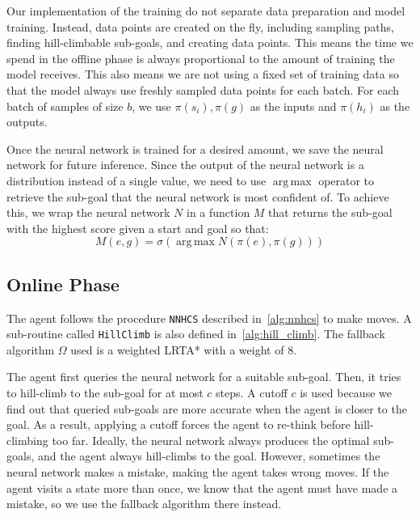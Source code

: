 \documentclass[letterpaper]{article}
\numberwithin{equation}{section}
\numberwithin{theorem}{section}
\numberwithin{lemma}{section}
\numberwithin{df}{section}
\DeclareMathOperator*{\argmax}{arg\,max}
\begin{document}
    Our implementation of the training do not separate data preparation and model training.
    Instead, data points are created on the fly, including sampling paths, finding hill-climbable sub-goals, and creating data points.
    This means the time we spend in the offline phase is always proportional to the amount of training the model receives.
    This also means we are not using a fixed set of training data so that the model always use freshly sampled data points for each batch.
    For each batch of samples of size $b$, we use $\pi(s_i), \pi(g)$ as the inputs and $\pi(h_i)$ as the outputs.

    Once the neural network is trained for a desired amount, we save the neural network for future inference.
    Since the output of the neural network is a distribution instead of a single value, we need to use $\argmax$ operator to retrieve the sub-goal that the neural network is most confident of.
    To achieve this, we wrap the neural network $N$ in a function $M$ that returns the sub-goal with the highest score given a start and goal so that:
    \[ M(e, g) = \sigma(\argmax N(\pi(e), \pi(g))) \]

    \subsection{Online Phase}

    The agent follows the procedure \texttt{NNHCS} described in~\ref{alg:nnhcs} to make moves.
    A sub-routine called \texttt{HillClimb} is also defined in~\ref{alg:hill_climb}.
    The fallback algorithm $\Omega$ used is a weighted LRTA* with a weight of 8.

    The agent first queries the neural network for a suitable sub-goal.
    Then, it tries to hill-climb to the sub-goal for at most $c$ steps.
    A cutoff $c$ is used because we find out that queried sub-goals are more accurate when the agent is closer to the goal.
    As a result, applying a cutoff forces the agent to re-think before hill-climbing too far.
    Ideally, the neural network always produces the optimal sub-goals, and the agent always hill-climbs to the goal.
    However, sometimes the neural network makes a mistake, making the agent takes wrong moves.
    If the agent visits a state more than once, we know that the agent must have made a mistake, so we use the fallback algorithm there instead.
\end{document}

